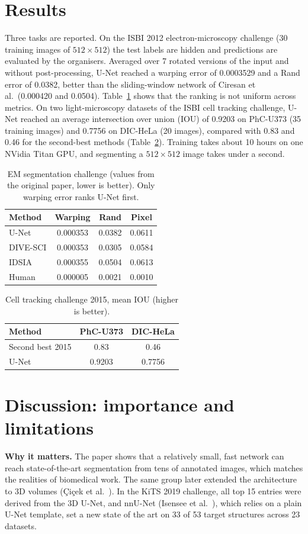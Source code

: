 \documentclass[10pt,twocolumn]{article}
\begin{document}
\section{Results}
Three tasks are reported. On the ISBI 2012 electron-microscopy challenge (30 training images of $512\times512$) the test labels are hidden and predictions are evaluated by the organisers. Averaged over 7 rotated versions of the input and without post-processing, U-Net reached a warping error of 0.0003529 and a Rand error of 0.0382, better than the sliding-window network of Ciresan et al.\ (0.000420 and 0.0504). Table~\ref{tab:em} shows that the ranking is not uniform across metrics. On two light-microscopy datasets of the ISBI cell tracking challenge, U-Net reached an average intersection over union (IOU) of 0.9203 on PhC-U373 (35 training images) and 0.7756 on DIC-HeLa (20 images), compared with 0.83 and 0.46 for the second-best methods (Table~\ref{tab:iou}). Training takes about 10 hours on one NVidia Titan GPU, and segmenting a $512\times512$ image takes under a second.

\begin{table}[t]
\centering\small
\caption{EM segmentation challenge (values from the original paper, lower is better). Only warping error ranks U-Net first.}
\label{tab:em}
\begin{tabular}{lccc}
\toprule
Method & Warping & Rand & Pixel\\
\midrule
U-Net & 0.000353 & 0.0382 & 0.0611\\
DIVE-SCI & 0.000353 & 0.0305 & 0.0584\\
IDSIA~\cite{ciresan} & 0.000355 & 0.0504 & 0.0613\\
Human & 0.000005 & 0.0021 & 0.0010\\
\bottomrule
\end{tabular}
\end{table}

\begin{table}[t]
\centering\small
\caption{Cell tracking challenge 2015, mean IOU (higher is better).}
\label{tab:iou}
\begin{tabular}{lcc}
\toprule
Method & PhC-U373 & DIC-HeLa\\
\midrule
Second best 2015 & 0.83 & 0.46\\
U-Net & 0.9203 & 0.7756\\
\bottomrule
\end{tabular}
\end{table}

\section{Discussion: importance and limitations}
\textbf{Why it matters.} The paper shows that a relatively small, fast network can reach state-of-the-art segmentation from tens of annotated images, which matches the realities of biomedical work. The same group later extended the architecture to 3D volumes (\c{C}i\c{c}ek et al.~\cite{cicek}). In the KiTS 2019 challenge, all top 15 entries were derived from the 3D U-Net, and nnU-Net (Isensee et al.~\cite{nnunet}), which relies on a plain U-Net template, set a new state of the art on 33 of 53 target structures across 23 datasets.
\end{document}
